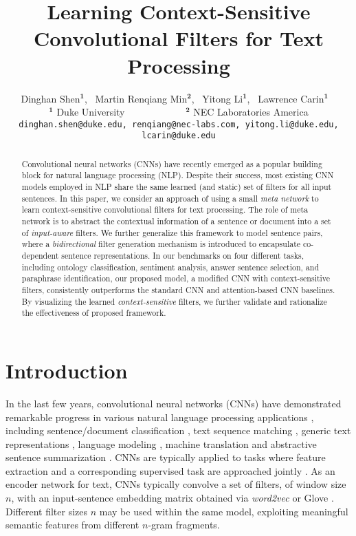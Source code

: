 \documentclass[11pt,a4paper]{article}
\title{Learning Context-Sensitive Convolutional Filters for Text Processing}
\author{Dinghan Shen$^{\mathbf{1}}$, ~Martin Renqiang Min$^{\mathbf{2}}$, ~Yitong Li$^{\mathbf{1}}$, ~Lawrence Carin$^{\mathbf{1}}$
	\smallskip
	~  \\
	\smallskip 
	$^{\mathbf{1}}$ Duke University~~~~~~~~~~~~ 
	$^{\mathbf{2}}$ NEC Laboratories America \\
{\small \tt dinghan.shen@duke.edu, renqiang@nec-labs.com, yitong.li@duke.edu, 
		lcarin@duke.edu} 
	}
\date{}
\begin{document}
\maketitle
\begin{abstract}
Convolutional neural networks (CNNs) have recently emerged as a popular building block for natural language processing (NLP). Despite their success, most existing CNN models employed in NLP share the  same learned (and static) set of filters for all input sentences. In this paper, we consider an approach of using a small \emph{meta network} to learn context-sensitive convolutional filters for text processing. The role of meta network is to abstract the contextual information of a sentence or document into a set of \emph{input-aware} filters. We further generalize this framework to model sentence pairs, where a \emph{bidirectional} filter generation mechanism is introduced to encapsulate co-dependent sentence representations.  In our benchmarks on four different tasks,  including ontology classification, sentiment analysis, answer sentence selection, and paraphrase identification, our proposed model, a modified CNN with context-sensitive filters, consistently outperforms the standard CNN and attention-based CNN baselines. By visualizing the learned \emph{context-sensitive} filters, we further validate and rationalize the effectiveness of proposed framework.





\end{abstract}

\section{Introduction}

In the last few years, convolutional neural networks (CNNs) have demonstrated remarkable progress in various natural language processing applications \cite{collobert2011natural}, including sentence/document classification \citep{kim2014convolutional,zhang2015character, wang2018joint}, text sequence matching \citep{hu2014convolutional,yin2015abcnn, shen2017deconvolutional}, generic text representations \citep{gan2016learning, tang2018speeding}, language modeling \citep{dauphin2016language}, machine translation \citep{gehring2017convolutional} and abstractive sentence summarization \citep{gehring2017convolutional}. 
CNNs are typically applied to tasks where feature extraction and a corresponding supervised task are approached jointly \citep{lecun1998gradient}. 
As an encoder network for text, CNNs typically convolve a set of filters, of window size $n$, with an input-sentence embedding matrix obtained via \emph{word2vec} \citep{mikolov2013distributed} or Glove \citep{pennington2014glove}.
Different filter sizes $n$ may be used within the same model, exploiting meaningful semantic features from different $n$-gram fragments. 
\end{document}
